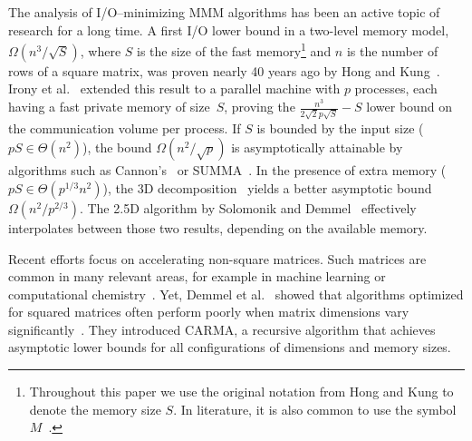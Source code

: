 \documentclass[sigplan,review,anonymous,10pt]{acmart}\settopmatter{printfolios=true,printccs=false,printacmref=false}
\newcommand\greg[1]{\textcolor{blue}{[Greg: #1]}}
\newcommand\mac[1]{\textcolor{red}{[Mac: #1]}}
\begin{document}
The analysis of I/O--minimizing MMM algorithms has been an active topic of 
research 
for a 
long time. 
A first I/O lower bound in a two-level 
memory
model, $\Omega\left({n^3}/{\sqrt{S}}\right)$, where $S$ is the size of the fast
memory\footnote{Throughout this paper we use the original notation from Hong
and Kung to denote the memory size $S$. In literature, it is also common to use
the symbol $M$~\cite{externalMem,IronyMMM, parallelExMem}.} and $n$ is the
number of rows of a square matrix, was proven nearly 40 years ago by
Hong and Kung~\cite{redblue}.
%
%
Irony et al.~\cite{IronyMMM} extended this
result to a parallel machine with $p$ processes,
each having a fast private memory of size~$S$, proving the
$\frac{n^3}{2\sqrt{2}p\sqrt{S}} - S$ 
lower bound on the communication volume 
per 
process.
%
%
If $S$ is bounded by the input size ($pS \in \Theta(n^2)$), the bound
$\Omega\left({n^2}/{\sqrt{p}}\right)$  is asymptotically attainable by
algorithms such as Cannon's~\cite{Cannon} or SUMMA~\cite{summa}. In the
presence of extra memory ($pS \in \Theta(p^{1/3} n^2)$), the 3D
decomposition~\cite{summa3d} yields a better asymptotic bound
$\Omega\left({n^2}/{p^{2/3}}\right)$. The 2.5D algorithm by Solomonik
and Demmel~\cite{25d} effectively interpolates
between those two results, depending on the available
memory.

Recent efforts focus on accelerating 
non-square matrices. Such matrices are common in many
relevant areas, for example in machine learning
\cite{rectangularML} or computational chemistry~\cite{rectangularChemistry}.
%
Yet, Demmel et al.~\cite{CARMA} showed
that algorithms optimized for squared matrices often perform poorly
when matrix dimensions vary significantly~\cite{CARMA}. They introduced CARMA, 
a recursive algorithm that achieves asymptotic lower bounds for all
configurations of dimensions and memory sizes.  

\end{document}
